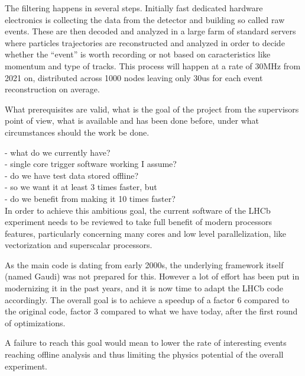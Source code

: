 \documentclass[12pt]{article}
\newcommand\tab[1][.7cm]{\hspace*{#1}}
\begin{document}
        The filtering happens in several steps. Initially fast dedicated hardware electronics is collecting the data from the detector and building so called raw events. These are then decoded and analyzed in a large farm of standard servers where particles trajectories are reconstructed and analyzed in order to decide whether the ``event'' is worth recording or not based on caracteristics like momentum and type of tracks. This process will happen at a rate of 30MHz from 2021 on, distributed across 1000 nodes leaving only 30us for each event reconstruction on average.
        \color{black}
	
	\vspace{1pc}
	
	\color{red}
	What prerequisites are valid, what is the goal of the project from the supervisors point of view, what is available and has been done before, under what circumstances should the work be done.
	\color{black}

	\color{blue}
	- what do we currently have? \\
	\tab - single core trigger software working I assume? \\
	\tab - do we have test data stored offline? \\
	- so we want it at least 3 times faster, but \\
	\tab - do we benefit from making it 10 times faster? \\

        In order to achieve this ambitious goal, the current software of the LHCb experiment needs to be reviewed to take full benefit of modern processors features, particularly concerning many cores and low level parallelization, like vectorization and superscalar processors.

        As the main code is dating from early 2000s, the underlying framework itself (named Gaudi) was not prepared for this. However a lot of effort has been put in modernizing it in the past years, and it is now time to adapt the LHCb code accordingly. The overall goal is to achieve a speedup of a factor 6 compared to the original code, factor 3 compared to what we have today, after the first round of optimizations.

        A failure to reach this goal would mean to lower the rate of interesting events reaching offline analysis and thus limiting the physics potential of the overall experiment.
        
	\color{black}
	
	
	\newpage
\end{document}
